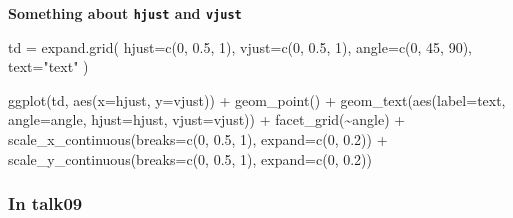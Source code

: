 \documentclass[
]{article}
\newenvironment{Shaded}{}{}
\newcommand{\AttributeTok}[1]{\textcolor[rgb]{0.49,0.56,0.16}{#1}}
\newcommand{\DecValTok}[1]{\textcolor[rgb]{0.25,0.63,0.44}{#1}}
\newcommand{\FloatTok}[1]{\textcolor[rgb]{0.25,0.63,0.44}{#1}}
\newcommand{\FunctionTok}[1]{\textcolor[rgb]{0.02,0.16,0.49}{#1}}
\newcommand{\NormalTok}[1]{#1}
\newcommand{\OtherTok}[1]{\textcolor[rgb]{0.00,0.44,0.13}{#1}}
\newcommand{\SpecialCharTok}[1]{\textcolor[rgb]{0.25,0.44,0.63}{#1}}
\newcommand{\StringTok}[1]{\textcolor[rgb]{0.25,0.44,0.63}{#1}}
\begin{document}
\textbf{Something about \texttt{hjust} and \texttt{vjust}}

\begin{Shaded}
\begin{Highlighting}[]
\NormalTok{td }\OtherTok{=} \FunctionTok{expand.grid}\NormalTok{(}
    \AttributeTok{hjust=}\FunctionTok{c}\NormalTok{(}\DecValTok{0}\NormalTok{, }\FloatTok{0.5}\NormalTok{, }\DecValTok{1}\NormalTok{),}
    \AttributeTok{vjust=}\FunctionTok{c}\NormalTok{(}\DecValTok{0}\NormalTok{, }\FloatTok{0.5}\NormalTok{, }\DecValTok{1}\NormalTok{),}
    \AttributeTok{angle=}\FunctionTok{c}\NormalTok{(}\DecValTok{0}\NormalTok{, }\DecValTok{45}\NormalTok{, }\DecValTok{90}\NormalTok{),}
    \AttributeTok{text=}\StringTok{"text"}
\NormalTok{)}

\FunctionTok{ggplot}\NormalTok{(td, }\FunctionTok{aes}\NormalTok{(}\AttributeTok{x=}\NormalTok{hjust, }\AttributeTok{y=}\NormalTok{vjust)) }\SpecialCharTok{+} 
    \FunctionTok{geom\_point}\NormalTok{() }\SpecialCharTok{+}
    \FunctionTok{geom\_text}\NormalTok{(}\FunctionTok{aes}\NormalTok{(}\AttributeTok{label=}\NormalTok{text, }\AttributeTok{angle=}\NormalTok{angle, }\AttributeTok{hjust=}\NormalTok{hjust, }\AttributeTok{vjust=}\NormalTok{vjust)) }\SpecialCharTok{+} 
    \FunctionTok{facet\_grid}\NormalTok{(}\SpecialCharTok{\textasciitilde{}}\NormalTok{angle) }\SpecialCharTok{+}
    \FunctionTok{scale\_x\_continuous}\NormalTok{(}\AttributeTok{breaks=}\FunctionTok{c}\NormalTok{(}\DecValTok{0}\NormalTok{, }\FloatTok{0.5}\NormalTok{, }\DecValTok{1}\NormalTok{), }\AttributeTok{expand=}\FunctionTok{c}\NormalTok{(}\DecValTok{0}\NormalTok{, }\FloatTok{0.2}\NormalTok{)) }\SpecialCharTok{+}
    \FunctionTok{scale\_y\_continuous}\NormalTok{(}\AttributeTok{breaks=}\FunctionTok{c}\NormalTok{(}\DecValTok{0}\NormalTok{, }\FloatTok{0.5}\NormalTok{, }\DecValTok{1}\NormalTok{), }\AttributeTok{expand=}\FunctionTok{c}\NormalTok{(}\DecValTok{0}\NormalTok{, }\FloatTok{0.2}\NormalTok{))}
\end{Highlighting}
\end{Shaded}

\hypertarget{in-talk09}{%
\subsubsection{\texorpdfstring{In talk09
}{In talk09 }}\label{in-talk09}}
\end{document}
